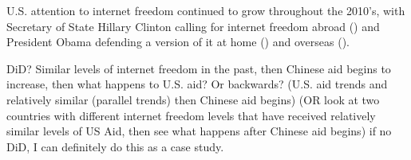  U.S. attention to internet freedom continued to grow throughout the 2010's, with Secretary of State Hillary Clinton calling for internet freedom abroad (\cite{government2010}) and President Obama defending a version of it at home (\cite{government2016}) and overseas (\cite{richburg2009}).
 
 DiD? Similar levels of internet freedom in the past, then Chinese aid begins to increase, then what happens to U.S. aid? Or backwards? (U.S. aid trends and relatively similar (parallel trends) then Chinese aid begins) (OR look at two countries with different internet freedom levels that have received relatively similar levels of US Aid, then see what happens after Chinese aid begins) if no DiD, I can definitely do this as a case study.